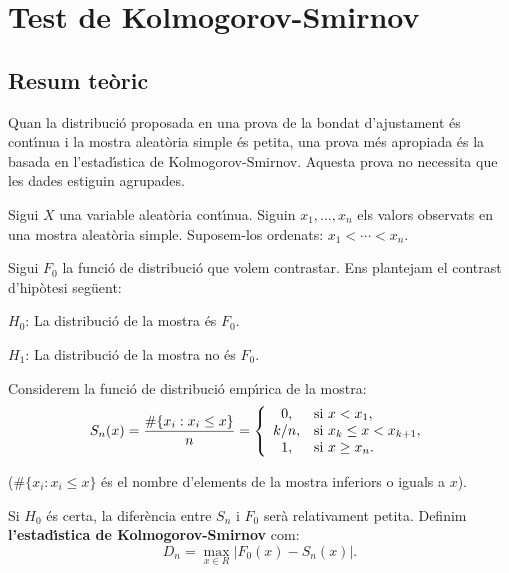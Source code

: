 \chapter{Test de Kolmogorov-Smirnov}

\section{Resum te\`oric}

Quan la distribuci\'o proposada en una prova de la bondat d'ajustament 
\'es cont\'{\i}nua i la
mostra aleat\`oria simple \'es petita, una prova m\'es apropiada 
\'es la basada en l'estad\'{\i}stica de Kolmogorov-Smirnov. 
Aquesta prova no necessita que les dades estiguin agrupades.

Sigui $X$ una variable aleat\`oria cont\'{\i}nua. 
Siguin $x_1, \ldots , x_n$ els valors observats en una mostra aleat\`oria 
simple. Suposem-los ordenats: $x_1 < \cdots < x_n$.

Sigui $F_0$ la funci\'o de distribuci\'o que volem contrastar. 
Ens plantejam el
contrast d'hip\`otesi seg\"uent:

\begin{description}
\item $H_0$: La distribuci\'o de la mostra \'es $F_0$.
\item $H_1$: La distribuci\'o de la mostra no \'es $F_0$.
\end{description}

Considerem la funci\'o de distribuci\'o emp\'{\i}rica de la mostra:
$$S_n(x) = {\# \{ x_i : x_i \leq x \} \over n} = \left \{ 
\begin{array}{cll} 
0, & {\rm si} \ x < x_1,\\ 
k/n, & {\rm si} \ x_k \leq x < x_{k+1},\\ 
1, & {\rm si} \ x \geq x_n.
\end{array} \right.$$

($\# \{ x_i : x_i \leq x \}$ \'es el nombre d'elements de la mostra inferiors o
iguals a $x$).

Si $H_0$ \'es certa, la difer\`encia entre $S_n$ i $F_0$ ser\`a relativament petita.
Definim {\bf l'estad\'{\i}stica de Kolmogorov-Smirnov} com:
$$D_n = \max_{x \in R} |F_0(x) - S_n(x)|.$$

